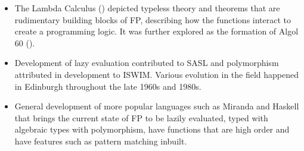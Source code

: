 \begin{itemize}
  \item The Lambda Calculus (\textcite{Rosser1941-ROSCAT-17}) depicted typeless theory and theorems that are rudimentary building blocks of FP, describing how the functions interact to create a programming logic. It was further explored as the formation of Algol 60 (\textcite{backus1963revised}).
  \item Development of lazy evaluation contributed to SASL and polymorphism attributed in development to ISWIM. Various evolution in the field happened in Edinburgh throughout the late 1960s and 1980s.
  \item General development of more popular languages such as Miranda and Haskell that brings the current state of FP to be lazily evaluated, typed with algebraic types with polymorphism, have functions that are high order and have features such as pattern matching inbuilt. 
\end{itemize}

